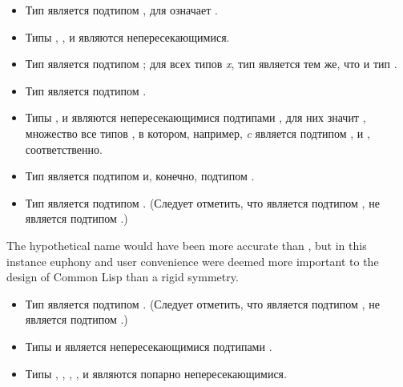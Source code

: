 \begin{itemize}
\item
Тип  является подтипом , для 
означает .

\item
Типы , , и  являются непересекающимися.

\item
Тип  является подтипом ; для всех типов \emph{x},
тип  является тем же, что и тип .

\item
Тип  является подтипом .
\end{itemize}

\begin{itemize}
\item
Типы ,  и
 являются непересекающимися подтипами ,
для них значит
 , множество все типов
, в котором, например, \emph{c} является подтипом ,
и , соответственно.
\end{itemize}


\begin{itemize}
\item
Тип  является подтипом  и, конечно, подтипом
. 

\item
Тип  является подтипом .
(Следует отметить, что  является подтипом ,
 не является подтипом .)
\end{itemize}

\beforenoterule
\begin{rationale}
The hypothetical name  would have been more accurate than
, but in this instance euphony and
user convenience were deemed more important to the design
of Common Lisp than a rigid symmetry.
\end{rationale}
\afternoterule

\begin{itemize}
\item
Тип  является подтипом .
(Следует отметить, что  является подтипом ,
 не является подтипом .)

\item
Типы  и  является непересекающимися подтипами .

\item
Типы , , , ,
 и  являются попарно непересекающимися.
\end{itemize}

